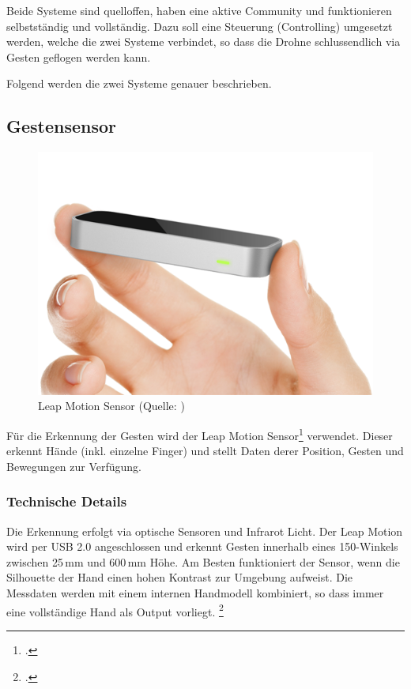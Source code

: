 Beide Systeme sind quelloffen, haben eine aktive Community und funktionieren selbstständig und vollständig.
Dazu soll eine Steuerung (Controlling) umgesetzt werden, welche die zwei Systeme verbindet, so dass die Drohne schlussendlich via Gesten geflogen werden kann.

Folgend werden die zwei Systeme genauer beschrieben.

\newpage
\subsection{Gestensensor}
\label{subsec:leapmotion}
\begin{figure}
	\includegraphics[width=1.0\linewidth]{images/analysis/leap_simple.png}
	\caption[Leap Motion Sensor]{Leap Motion Sensor (Quelle: )}
\end{figure}

Für die Erkennung der Gesten wird der Leap Motion Sensor\footcite{Leap_Motion_Motion_Controller_2015-03-27} verwendet.
Dieser erkennt Hände (inkl. einzelne Finger) und stellt Daten derer Position, Gesten und Bewegungen zur Verfügung.

\subsubsection{Technische Details}
Die Erkennung erfolgt via optische Sensoren und Infrarot Licht.
Der Leap Motion wird per USB 2.0 angeschlossen und erkennt Gesten innerhalb eines 150\textdegree-Winkels zwischen 25\,mm und 600\,mm Höhe.
Am Besten funktioniert der Sensor, wenn die Silhouette der Hand einen hohen Kontrast zur Umgebung aufweist.
Die Messdaten werden mit einem internen Handmodell kombiniert, so dass immer eine vollständige Hand als Output vorliegt.
\footcite{API_Overview__Leap_Motion_v2.2_documentation_2015-03-27}


